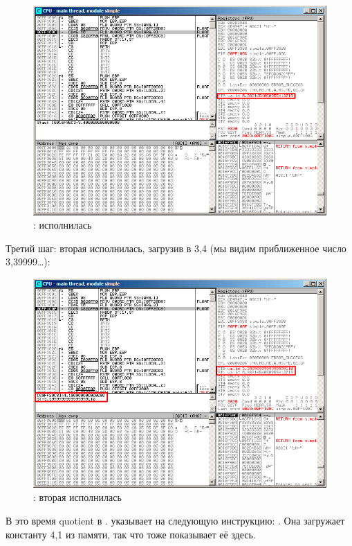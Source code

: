 \begin{figure}[H]
\centering
\includegraphics[scale=\FigScale]{patterns/12_FPU/1_simple/olly2.png}
\caption{\olly: \FDIV исполнилась}
\label{fig:FPU_simple_olly_2}
\end{figure}

\clearpage
Третий шаг: вторая \FLD 
исполнилась, загрузив в  3,4 (мы видим приближенное число 3,39999\ldots): 

\begin{figure}[H]
\centering
\includegraphics[scale=\FigScale]{patterns/12_FPU/1_simple/olly3.png}
\caption{\olly: вторая \FLD исполнилась}
\label{fig:FPU_simple_olly_3}
\end{figure}

В это время \gls{quotient}  
в .
\EIP указывает на следующую инструкцию: \FMUL. 
Она загружает константу 4,1 из памяти, так что \olly тоже показывает её здесь.

